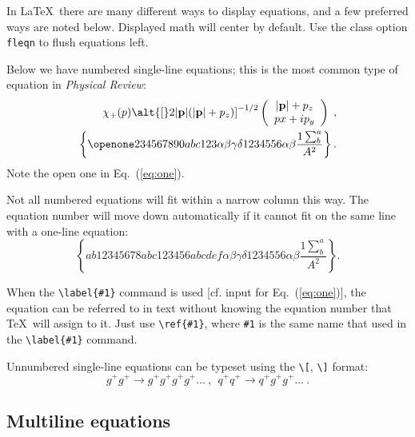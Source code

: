 \documentclass[%
 reprint,
 amsmath,amssymb,
 aps,
]{revtex4-2}
\begin{document}
In \LaTeX\ there are many different ways to display equations, and a
few preferred ways are noted below. Displayed math will center by
default. Use the class option \verb+fleqn+ to flush equations left.

Below we have numbered single-line equations; this is the most common
type of equation in \textit{Physical Review}:
\begin{eqnarray}
  \chi_+(p)\alt{\bf [}2|{\bf p}|(|{\bf p}|+p_z){\bf ]}^{-1/2}
  \left(
    \begin{array}{c}
      |{\bf p}|+p_z\\
      px+ip_y
  \end{array}\right)\;,
  \\
  \left\{%
    \openone234567890abc123\alpha\beta\gamma\delta1234556\alpha\beta
    \frac{1\sum^{a}_{b}}{A^2}%
  \right\}%
  \label{eq:one}.
\end{eqnarray}
Note the open one in Eq.~(\ref{eq:one}).

Not all numbered equations will fit within a narrow column this
way. The equation number will move down automatically if it cannot fit
on the same line with a one-line equation:
\begin{equation}
  \left\{
    ab12345678abc123456abcdef\alpha\beta\gamma\delta1234556\alpha\beta
    \frac{1\sum^{a}_{b}}{A^2}%
  \right\}.
\end{equation}

When the \verb+\label{#1}+ command is used [cf. input for
Eq.~(\ref{eq:one})], the equation can be referred to in text without
knowing the equation number that \TeX\ will assign to it. Just
use \verb+\ref{#1}+, where \verb+#1+ is the same name that used in
the \verb+\label{#1}+ command.

Unnumbered single-line equations can be typeset
using the \verb+\[+, \verb+\]+ format:
\[g^+g^+ \rightarrow g^+g^+g^+g^+ \dots ~,~~q^+q^+\rightarrow
q^+g^+g^+ \dots ~. \]


\subsection{Multiline equations}
\end{document}
